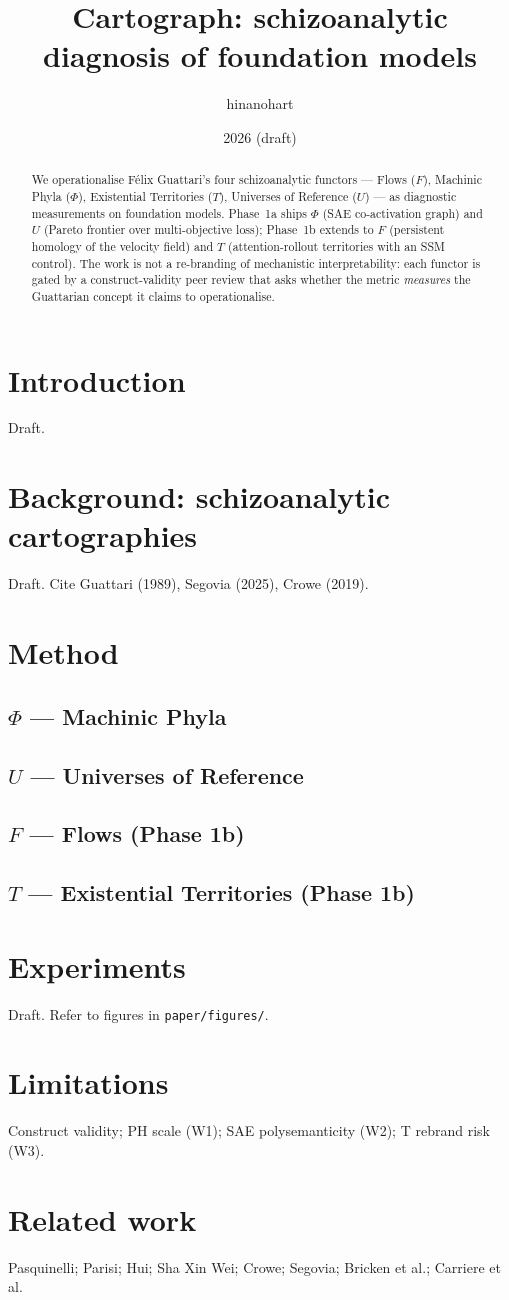 \documentclass{article}
\title{Cartograph: schizoanalytic diagnosis of foundation models}
\author{hinanohart}
\date{2026 (draft)}
\begin{document}
\maketitle

\begin{abstract}
We operationalise Félix Guattari's four schizoanalytic functors — Flows ($F$),
Machinic Phyla ($\Phi$), Existential Territories ($T$), Universes of Reference
($U$) — as diagnostic measurements on foundation models. Phase~1a ships $\Phi$
(SAE co-activation graph) and $U$ (Pareto frontier over multi-objective loss);
Phase~1b extends to $F$ (persistent homology of the velocity field) and $T$
(attention-rollout territories with an SSM control). The work is not a
re-branding of mechanistic interpretability: each functor is gated by a
construct-validity peer review that asks whether the metric \emph{measures} the
Guattarian concept it claims to operationalise.
\end{abstract}

\section{Introduction}
Draft.

\section{Background: schizoanalytic cartographies}
Draft. Cite Guattari (1989), Segovia (2025), Crowe (2019).

\section{Method}
\subsection{$\Phi$ — Machinic Phyla}
\subsection{$U$ — Universes of Reference}
\subsection{$F$ — Flows (Phase 1b)}
\subsection{$T$ — Existential Territories (Phase 1b)}

\section{Experiments}
Draft. Refer to figures in \texttt{paper/figures/}.

\section{Limitations}
Construct validity; PH scale (W1); SAE polysemanticity (W2); T rebrand risk (W3).

\section{Related work}
Pasquinelli; Parisi; Hui; Sha Xin Wei; Crowe; Segovia; Bricken et al.;
Carriere et al.


% 
\end{document}
